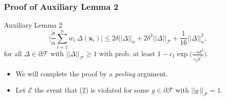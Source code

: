 \documentclass[11pt]{beamer}
\newcommand{\Prob}{\mathbb{P}}
\newcommand{\bx}{\mathbf{x}}
\newcommand{\cF}{\mathcal{F}}
\begin{document}
	\begin{frame}
		\frametitle{Proof of Auxiliary Lemma 2}
		\begin{block}{Auxiliary Lemma 2}
			\begin{equation}
			\Big|\frac{\tilde\sigma}{n} \sum_{i = 1}^{n} w_i\,\Delta(\bx_i)\Big| \leq 2\delta||\Delta||_n + 2\delta^2 ||\Delta||_\cF + \frac{1}{16} ||\Delta||_n^2,
			\end{equation}
			for all $\Delta \in \partial \cF$ with $||\Delta||_\cF\geq 1$ with prob. at least $1 - c_1 \exp\big(\frac{-n\delta^2}{c_2 \tilde{\sigma}^2}\big)$.
		\end{block}
		\begin{itemize}			
			\item We will complete the proof by a \textit{peeling} argument.
			\item Let $\mathcal{E}$ the event that (2) is violated for some $g\in\partial\cF$ with $||g\,||_\cF=1$.
		\end{itemize}
	\end{frame}
\end{document}
